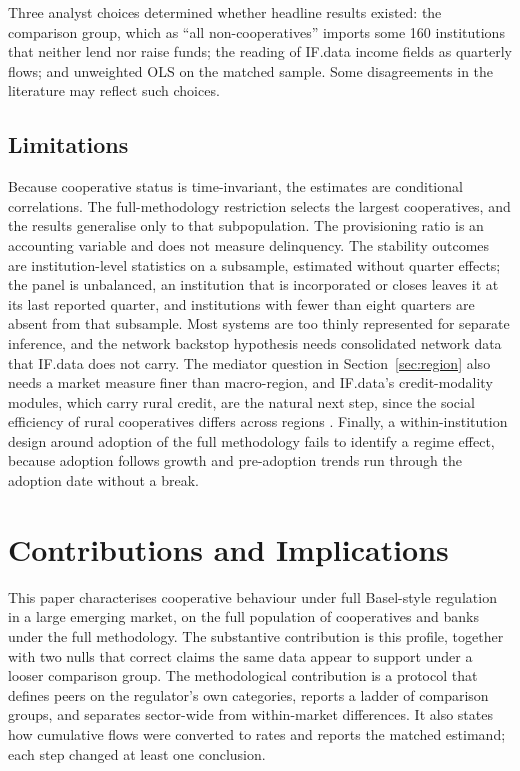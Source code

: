 \documentclass[11pt,a4paper]{article}
\begin{document}
Three analyst choices determined whether headline results existed: the comparison
group, which as ``all non-cooperatives'' imports some 160 institutions that neither lend
nor raise funds; the reading of IF.data income fields as quarterly flows; and unweighted
OLS on the matched sample. Some disagreements in the literature may reflect such choices.

\subsection{Limitations}

Because cooperative status is time-invariant, the
estimates are conditional correlations. The full-methodology restriction selects the
largest cooperatives, and the results generalise only to that subpopulation. The
provisioning ratio is an accounting variable and does not measure delinquency. The
stability outcomes are institution-level statistics on a subsample, estimated without
quarter effects; the panel is unbalanced, an institution that is incorporated or closes
leaves it at its last reported quarter, and institutions with fewer than eight quarters
are absent from that subsample. Most systems are too thinly represented for separate inference, and the
network backstop hypothesis needs consolidated network data that IF.data does not carry.
The mediator question in Section~\ref{sec:region} also needs a market measure finer than
macro-region, and IF.data's credit-modality modules, which carry rural credit, are the
natural next step, since the social efficiency of rural cooperatives differs across
regions \citep{cavinato2023}. Finally, a within-institution design around adoption of the full
methodology fails to identify a regime effect, because adoption follows growth and
pre-adoption trends run through the adoption date without a break.

\section{Contributions and Implications}

This paper characterises cooperative behaviour under full Basel-style regulation in a
large emerging market, on the full population of cooperatives and banks under the full
methodology. The
substantive contribution is this profile, together with two nulls that correct claims the
same data appear to support under a looser comparison group. The methodological
contribution is a protocol that defines peers on the regulator's own categories, reports
a ladder of comparison groups, and separates sector-wide from within-market differences.
It also states how cumulative flows were converted to rates and reports the matched
estimand; each step changed at least one conclusion.
\end{document}
